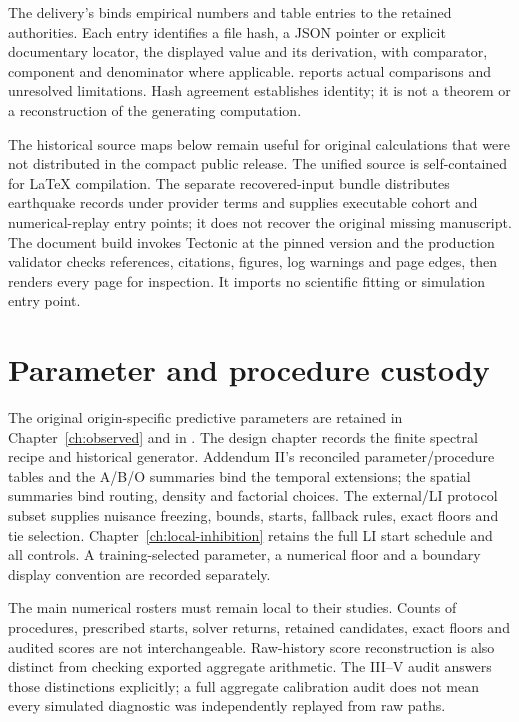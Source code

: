 The delivery's  binds empirical numbers and table entries to the retained authorities. Each entry identifies a file hash, a JSON pointer or explicit documentary locator, the displayed value and its derivation, with comparator, component and denominator where applicable.  reports actual comparisons and unresolved limitations. Hash agreement establishes identity; it is not a theorem or a reconstruction of the generating computation.

The historical source maps below remain useful for original calculations that were not distributed in the compact public release. The unified source is self-contained for LaTeX compilation. The separate recovered-input bundle distributes earthquake records under provider terms and supplies executable cohort and numerical-replay entry points; it does not recover the original missing manuscript. The document build invokes Tectonic at the pinned version and the production validator checks references, citations, figures, log warnings and page edges, then renders every page for inspection. It imports no scientific fitting or simulation entry point.

\section{Parameter and procedure custody}

The original origin-specific predictive parameters are retained in Chapter~\ref{ch:observed} and in . The design chapter records the finite spectral recipe and historical generator. Addendum II's reconciled parameter/procedure tables and the A/B/O summaries bind the temporal extensions; the spatial summaries bind routing, density and factorial choices. The external/LI protocol subset supplies nuisance freezing, bounds, starts, fallback rules, exact floors and tie selection. Chapter~\ref{ch:local-inhibition} retains the full LI start schedule and all controls. A training-selected parameter, a numerical floor and a boundary display convention are recorded separately.

The main numerical rosters must remain local to their studies. Counts of procedures, prescribed starts, solver returns, retained candidates, exact floors and audited scores are not interchangeable. Raw-history score reconstruction is also distinct from checking exported aggregate arithmetic. The III--V audit answers those distinctions explicitly; a full aggregate calibration audit does not mean every simulated diagnostic was independently replayed from raw paths.
